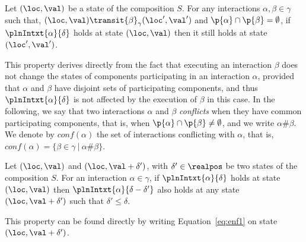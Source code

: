 \begin{property}\label{pt:plnIn1}
  Let $(\loc,\val)$ be a state of the composition $S$. For any interactions $\alpha,\beta\in\gamma$ such that, $(\loc,\val)\transit{\beta}_{\gamma}(\loc',\val')$
  and $\p{\alpha}\cap\p{\beta}=\emptyset$, if $\plnIntxt{\alpha}{\delta}$ holds at state $(\loc,\val)$ then it still holds at state $(\loc',\val')$.
\end{property}
This property derives directly from the fact that executing an interaction $\beta$ does not change the states of components participating in an interaction $\alpha$, provided that 
$\alpha$ and $\beta$ have disjoint sets of participating components, and thus $\plnIntxt{\alpha}{\delta}$ is not affected by the execution of $\beta$ in this case.
In the following, we say that two interactions $\alpha$ and $\beta$ \emph{conflicts} when they have common participating components, that is, when $\p{\alpha}\cap\p{\beta}\neq\emptyset$, and we write $\alpha\#\beta$.
We denote by $conf(\alpha)$ the set of interactions conflicting with $\alpha$, that is, $conf(\alpha) = \{ \beta \in \gamma \ | \ \alpha\#\beta \}$.

\begin{property}\label{pt:plnIn2}
  Let $(\loc,\val)$ and $(\loc,\val+\delta')$, with $\delta'\in\realpos$ be two states of the composition $S$. 
  For an interaction $\alpha\in\gamma$, if $\plnIntxt{\alpha}{\delta}$ holds at state $(\loc,\val)$ then $\plnIntxt{\alpha}{\delta-\delta'}$ also holds at any state $(\loc,\val+\delta')$ such that $\delta'\le\delta$.
\end{property}
This property can be found directly by writing Equation~\ref{eq:enf1} on state $(\loc,\val+\delta')$.


